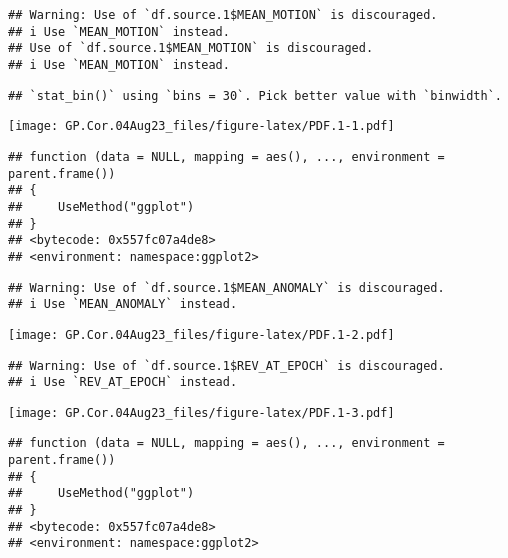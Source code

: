 \documentclass[
]{article}
\begin{document}
\begin{verbatim}
## Warning: Use of `df.source.1$MEAN_MOTION` is discouraged.
## i Use `MEAN_MOTION` instead.
## Use of `df.source.1$MEAN_MOTION` is discouraged.
## i Use `MEAN_MOTION` instead.
\end{verbatim}

\begin{verbatim}
## `stat_bin()` using `bins = 30`. Pick better value with `binwidth`.
\end{verbatim}

\texttt{[image: GP.Cor.04Aug23\_files/figure-latex/PDF.1-1.pdf]}

\begin{verbatim}
## function (data = NULL, mapping = aes(), ..., environment = parent.frame()) 
## {
##     UseMethod("ggplot")
## }
## <bytecode: 0x557fc07a4de8>
## <environment: namespace:ggplot2>
\end{verbatim}

\begin{verbatim}
## Warning: Use of `df.source.1$MEAN_ANOMALY` is discouraged.
## i Use `MEAN_ANOMALY` instead.
\end{verbatim}

\texttt{[image: GP.Cor.04Aug23\_files/figure-latex/PDF.1-2.pdf]}

\begin{verbatim}
## Warning: Use of `df.source.1$REV_AT_EPOCH` is discouraged.
## i Use `REV_AT_EPOCH` instead.
\end{verbatim}

\texttt{[image: GP.Cor.04Aug23\_files/figure-latex/PDF.1-3.pdf]}

\begin{verbatim}
## function (data = NULL, mapping = aes(), ..., environment = parent.frame()) 
## {
##     UseMethod("ggplot")
## }
## <bytecode: 0x557fc07a4de8>
## <environment: namespace:ggplot2>
\end{verbatim}
\end{document}
